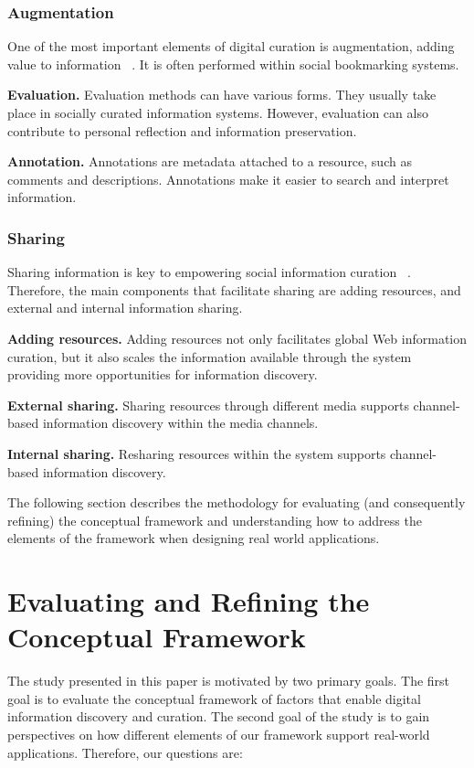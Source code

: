 \documentclass{casconpaper}
\begin{document}
{{\subsubsection{Augmentation}
One of the most important elements of digital curation is augmentation, adding value to information ~\cite{beagrie, wittaker}. It is often performed within social bookmarking systems.

\textbf{Evaluation.} Evaluation methods can have various forms. They usually take place in socially curated information systems. However, evaluation can also contribute to personal reflection and information preservation. 

\textbf{Annotation.} Annotations are metadata attached to a resource, such as comments and descriptions. Annotations make it easier to search and interpret information. 
} %

{\subsubsection{Sharing}
Sharing information is key to empowering social information curation ~\cite{beagrie}. Therefore, the main components that facilitate sharing are adding resources, and external and internal information sharing.

\textbf{Adding resources.} Adding resources not only facilitates global Web information curation, but it also scales the information available through the system providing more opportunities for information discovery.

\textbf{External sharing.} Sharing resources through different media supports channel-based information discovery within the media channels. 

\textbf{Internal sharing.} Resharing resources within the system supports channel-based information discovery. 
 

} %

The following section describes the methodology for evaluating (and consequently refining) the conceptual framework and understanding how to address the elements of the framework when designing real world applications.

{\section{Evaluating and Refining the Conceptual Framework}
The study presented in this paper is motivated by two primary goals. The first goal is to evaluate the conceptual framework of factors that enable digital information discovery and curation. The second goal of the study is to gain perspectives on how different elements of our framework support real-world applications. Therefore, our questions are:
\\

}}
\end{document}
